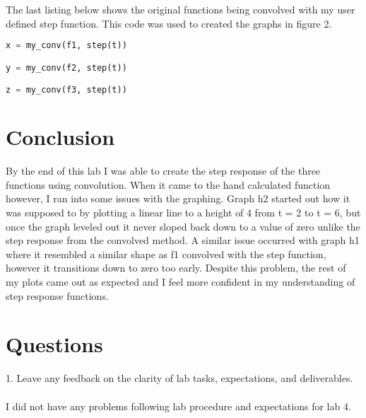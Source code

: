 \documentclass[12pt]{report}
\begin{document}
\hspace{\parindent}The last listing below shows the original functions being convolved with my user defined step function. This code was used to created the graphs in figure 2.
\begin{lstlisting}[language=Python, caption=Convolution Function]
x = my_conv(f1, step(t))

y = my_conv(f2, step(t))

z = my_conv(f3, step(t))
\end{lstlisting}

\section{Conclusion}
\hspace{\parindent}By the end of this lab I was able to create the step response of the three functions using convolution. When it came to the hand calculated function however, I ran into some issues with the graphing. Graph h2 started out how it was supposed to by plotting a linear line to a height of 4 from t = 2 to t = 6, but once the graph leveled out it never sloped back down to a value of zero unlike the step response from the convolved method. A similar issue occurred with graph h1 where it resembled a similar shape as f1 convolved with the step function, however it transitions down to zero too early. Despite this problem, the rest of my plots came out as expected and I feel more confident in my understanding of step response functions.

\section{Questions}
1. Leave any feedback on the clarity of lab tasks, expectations, and deliverables.\\\\
I did not have any problems following lab procedure and expectations for lab 4.
\end{document}
